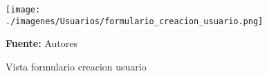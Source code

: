 \begin{figure}[!htb]
  \begin{center}
\texttt{[image: ./imagenes/Usuarios/formulario\_creacion\_usuario.png]}
    \caption{Vista formulario creacion usuario}
    \label{fig:Vista_formulario_creacion_usuario}
    \textbf{Fuente:}  Autores
  \end{center}
\end{figure}

